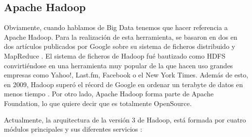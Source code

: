\subsection{Apache Hadoop\label{Hadoop}}



Obviamente, cuando hablamos de Big Data tenemos que hacer referencia a Apache Hadoop. Para la realización de esta herramienta, se basaron en dos en dos artículos publicados por Google sobre su sistema de ficheros distribuido \cite{Hdp-2} y MapReduce \cite{Hdp-3}. El sistema de ficheros de Hadoop fué bautizado como HDFS convirtiéndose en una herramienta muy popular de la que hacen uso grandes empresas como Yahoo!,   Last.fm, Facebook o el New York Times. Además de esto, en 2009, Hadoop superó el récord de Google en ordenar un terabyte de datos en menos tiempo \cite{Hdp-1}. Por otro lado, Apache Hadoop forma parte de Apache Foundation, lo que quiere decir que es totalmente OpenSource.\par

Actualmente, la arquitectura de la versión 3 de Hadoop, está formada por cuatro módulos principales y sus diferentes servicios \cite{Hdp-4}:\par

